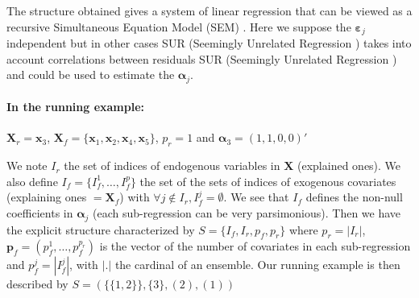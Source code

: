 \documentclass[12pt,a4paper]{report}
\begin{document}
The structure obtained gives a system of linear regression that can be viewed as a recursive Simultaneous Equation Model (\textsc{SEM})\cite{davidson1993estimation} \cite{TIMM}.
  	Here we suppose the $\boldsymbol{\varepsilon}_j$ independent but in other cases \textsc{SUR} (Seemingly Unrelated Regression \cite{SURzellner}) takes into account correlations between residuals \textsc{SUR} (Seemingly Unrelated Regression \cite{SURzellner}) and could be used to estimate the $\boldsymbol{\alpha}_j$. 
		 
	 
\paragraph{In the running example:}$\boldsymbol{X}_r=\boldsymbol{x}_3$, $\boldsymbol{X}_f=\{\boldsymbol{x}_1,\boldsymbol{x}_2,\boldsymbol{x}_4,\boldsymbol{x}_5 \}$, $p_r=1$ and $\boldsymbol{\alpha}_3=(1,1,0,0)'$








	We note $I_r$ the set of indices of endogenous variables in $\boldsymbol{X}$ (explained ones).
We also define $I_f=\{I_f^1,\dots,I_f^p \}$ the set of the sets of indices of exogenous covariates (explaining ones $=\boldsymbol{X}_f$) with $\forall j \notin I_r, I_f^j=\emptyset$. 
We see that $I_f$ defines the non-null coefficients in $\boldsymbol{\alpha}_j$ (each sub-regression can be very parsimonious).
Then we have the explicit structure characterized by $S=\{I_f,I_r,p_f,p_r\}$ where $p_r=|I_r|$, $\boldsymbol{p}_f=(p_f^1,\dots,p_f^{p_r})$ is the vector of the number of covariates in each sub-regression  and $p_f^j=|I_f^j|$, with $|.|$ the cardinal of an ensemble. Our running example is then described by $S= \left( \{ \{1,2\}\},\{3\},(2),(1)\right)$
\\





	
\end{document}
